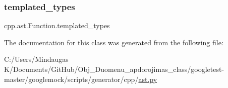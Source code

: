\subsubsection{\texorpdfstring{templated\_types}{templated\_types}}
{\footnotesize\ttfamily cpp.\+ast.\+Function.\+templated\+\_\+types}



The documentation for this class was generated from the following file\+:\begin{DoxyCompactItemize}
\item 
C\+:/\+Users/\+Mindaugas K/\+Documents/\+Git\+Hub/\+Obj\+\_\+\+Duomenu\+\_\+apdorojimas\+\_\+class/googletest-\/master/googlemock/scripts/generator/cpp/\mbox{\hyperlink{googletest-master_2googlemock_2scripts_2generator_2cpp_2ast_8py}{ast.\+py}}\end{DoxyCompactItemize}
